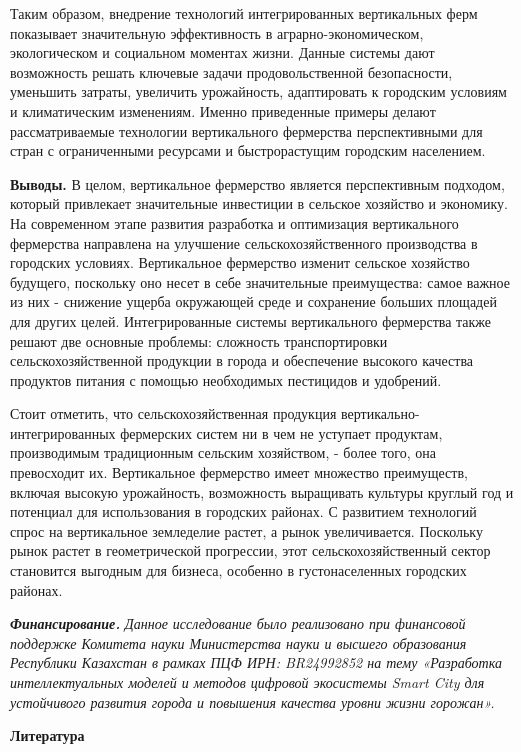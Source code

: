 \begin{multicols}{2}
Таким образом, внедрение технологий интегрированных вертикальных ферм
показывает значительную эффективность в аграрно-экономическом,
экологическом и социальном моментах жизни. Данные системы дают
возможность решать ключевые задачи продовольственной безопасности,
уменьшить затраты, увеличить урожайность, адаптировать к городским
условиям и климатическим изменениям. Именно приведенные примеры делают
рассматриваемые технологии вертикального фермерства перспективными для
стран с ограниченными ресурсами и быстрорастущим городским населением.

{\bfseries Выводы.} В целом, вертикальное фермерство является перспективным
подходом, который привлекает значительные инвестиции в сельское
хозяйство и экономику. На современном этапе развития разработка и
оптимизация вертикального фермерства направлена на улучшение
сельскохозяйственного производства в городских условиях. Вертикальное
фермерство изменит сельское хозяйство будущего, поскольку оно несет в
себе значительные преимущества: самое важное из них - снижение ущерба
окружающей среде и сохранение больших площадей для других целей.
Интегрированные системы вертикального фермерства также решают две
основные проблемы: сложность транспортировки сельскохозяйственной
продукции в города и обеспечение высокого качества продуктов питания с
помощью необходимых пестицидов и удобрений.

Стоит отметить, что сельскохозяйственная продукция
вертикально-интегрированных фермерских систем ни в чем не уступает
продуктам, производимым традиционным сельским хозяйством, - более того,
она превосходит их. Вертикальное фермерство имеет множество преимуществ,
включая высокую урожайность, возможность выращивать культуры круглый год
и потенциал для использования в городских районах. С развитием
технологий спрос на вертикальное земледелие растет, а рынок
увеличивается. Поскольку рынок растет в геометрической прогрессии, этот
сельскохозяйственный сектор становится выгодным для бизнеса, особенно в
густонаселенных городских районах.

\emph{{\bfseries Финансирование.}} \emph{Данное исследование было
реализовано при финансовой поддержке Комитета науки Министерства науки и
высшего образования Республики Казахстан в рамках ПЦФ ИРН: BR24992852 на
тему «Разработка интеллектуальных моделей и методов цифровой экосистемы
Smart City для устойчивого развития города и повышения качества уровни
жизни горожан».}
\end{multicols}

\begin{center}
{\bfseries Литература}
\end{center}

